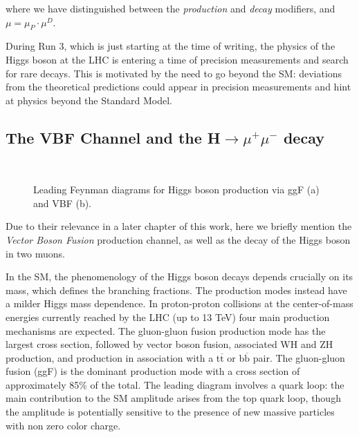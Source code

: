 where we have distinguished between the \emph{production} and \emph{decay} modifiers, and $\mu = \mu_P \cdot \mu^D$.

During Run 3, which is just starting at the time of writing, the
physics of the Higgs boson at the LHC is entering a time of precision measurements and
search for rare decays. This is motivated by the need to go beyond the SM: deviations from the theoretical predictions could appear in precision measurements and hint at physics beyond the Standard Model.

\subsection{The VBF Channel and the H$\rightarrow\mu^+\mu^-$ decay}

\begin{figure}
    \myfloatalign
     \quad
     \\
    \caption[ggF and VBF]{Leading Feynman diagrams for Higgs boson production via ggF (a) and VBF (b).}\label{fig:feypro}
\end{figure}

Due to their relevance in a later chapter of this work, here we briefly mention the \emph{Vector Boson Fusion} production channel, as well as the decay of the Higgs boson in two muons.

In the SM, the phenomenology of the Higgs boson decays depends crucially on its mass,
which defines the branching fractions. The production modes instead have a milder Higgs
mass dependence. In proton-proton collisions at the center-of-mass energies currently reached by the LHC
(up to 13 TeV) four main production mechanisms are expected. The gluon-gluon fusion
production mode has the largest cross section, followed by vector boson fusion, associated
WH and ZH production, and production in association with a t$\overline{\text{t}}$  or b$\overline{\text{b}}$ pair. The gluon-gluon fusion (ggF) is the dominant production mode with a cross section of
approximately 85$\%$ of the total. The leading diagram involves a quark loop: the main
contribution to the SM amplitude arises from the top quark loop, though the amplitude is
potentially sensitive to the presence of new massive particles with non zero color charge.

